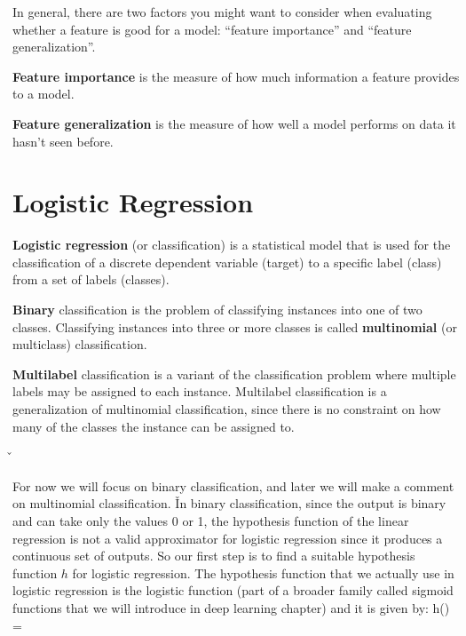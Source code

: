 In general, there are two factors you might want to consider when evaluating whether a feature is good for a model:
``feature importance'' and ``feature generalization''.

\textbf{Feature importance} is the measure of how much information a feature provides to a model.
\ed

\textbf{Feature generalization} is the measure of how well a model performs on data it hasn't seen before.
\ed

\section{Logistic Regression}

\textbf{Logistic regression} (or classification) is a statistical model that is used for the classification of a
discrete dependent variable (target) to a specific label (class) from a set of labels (classes).
\ed

\textbf{Binary} classification is the problem of classifying instances into one of two classes. Classifying instances
into three or more classes is called \textbf{multinomial} (or multiclass) classification.
\ed

\textbf{Multilabel} classification is a variant of the classification problem where multiple labels may be assigned
to each instance. Multilabel classification is a generalization of multinomial classification, since there is no
constraint on how many of the classes the instance can be assigned to. \ed

\v


For now we will focus on binary classification, and later we will make a comment on multinomial classification. \v

In binary classification, since the output is binary and can take only the values 0 or 1, the hypothesis function of
the linear regression is not a valid approximator for logistic regression since it produces a continuous set of
outputs. So our first step is to find a suitable hypothesis function $h$ for logistic regression. The hypothesis
function that we actually use in logistic regression is the logistic function (part of a broader family called
sigmoid functions that we will introduce in deep learning chapter) and it is given by:
\bse
h() = 
\ese

